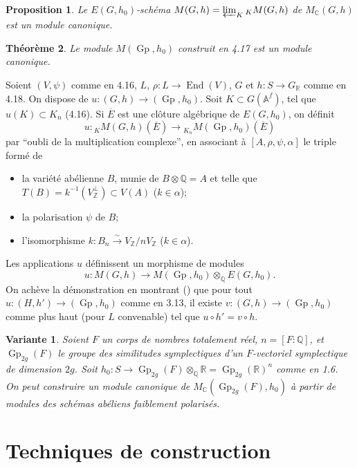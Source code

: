 \documentclass[11pt]{amsart}
\theoremstyle{plain}
\newtheorem{theorem}{Th\'eor\`eme}[section]
\newtheorem{proposition}[theorem]{Proposition}
\newtheorem{variante}{Variante}
\theoremstyle{definition}
\DeclareMathOperator{\End}{End}
\DeclareMathOperator{\Gp}{Gp}
\newcommand{\ZZ}{\mathbb{Z}}
\newcommand{\QQ}{\mathbb{Q}}
\newcommand{\RR}{\mathbb{R}}
\newcommand{\AAf}{\mathbb{A}^f}
\newcommand{\MC}{M_{\mathbb{C}}}
\begin{document}
\begin{proposition}
Le $E(G,h_0)$-sch\'ema $M(G,h) = \varprojlim_K {}_K M(G,h)$ de $\MC(G,h)$ est un module canonique.
\end{proposition}

\begin{theorem}
Le module $M(\Gp, h_0)$ construit en 4.17 est un module canonique.
\end{theorem}

Soient $(V, \psi)$ comme en 4.16, $L$, $\rho : L \to \End(V)$, $G$ et $h : S \to G_{\RR}$ comme en 4.18. On dispose de $u : (G,h) \to (\Gp, h_0)$. Soit $K \subset G(\AAf)$, tel que $u(K) \subset K_n$ (4.16). Si $\overline{E}$ est une cl\^oture alg\'ebrique de $E(G,h_0)$, on d\'efinit
\[
u : {}_K M(G,h)(\overline{E}) \longrightarrow {}_{K_n} M(\Gp, h_0)(\overline{E})
\]
par ``oubli de la multiplication complexe'', en associant \`a $[A, \rho, \psi, \alpha]$ le triple form\'e de
\begin{itemize}
\item[(a)] la vari\'et\'e ab\'elienne $B$, munie de $B \otimes \QQ = A$ et telle que $T(B) = k^{-1}(V_{\ZZ}^\perp) \subset V(A)$ ($k \in \alpha$);
\item[(b)] la polarisation $\psi$ de $B$;
\item[(c)] l'isomorphisme $k : B_n \xrightarrow{\sim} V_{\ZZ}/nV_{\ZZ}$ ($k \in \alpha$).
\end{itemize}
Les applications $u$ d\'efinissent un morphisme de modules
\[
u : M(G,h) \longrightarrow M(\Gp, h_0) \otimes_{\QQ} E(G,h_0).
\]
On ach\`eve la d\'emonstration en montrant (\cite{Mu3}) que pour tout $u : (H,h') \to (\Gp, h_0)$ comme en 3.13, il existe $v : (G,h) \to (\Gp, h_0)$ comme plus haut (pour $L$ convenable) tel que $u \circ h' = v \circ h$.

\begin{variante}
Soient $F$ un corps de nombres totalement r\'eel, $n = [F : \QQ]$, et $\Gp_{2g}(F)$ le groupe des similitudes symplectiques d'un $F$-vectoriel symplectique de dimension $2g$. Soit $h_0 : S \to \Gp_{2g}(F) \otimes_{\QQ} \RR = \Gp_{2g}(\RR)^n$ comme en 1.6. On peut construire un module canonique de $\MC(\Gp_{2g}(F), h_0)$ \`a partir de modules des sch\'emas ab\'eliens faiblement polaris\'es.
\end{variante}

\section{Techniques de construction}
\end{document}
